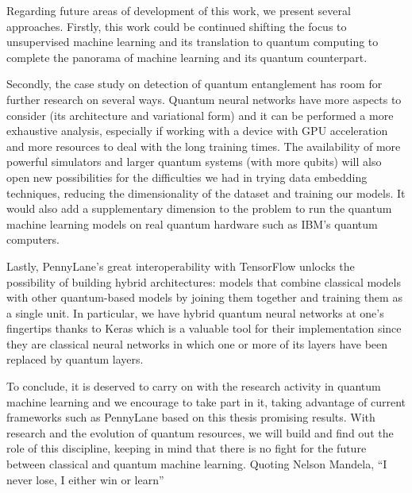 Regarding future areas of development of this work, we present several approaches. Firstly, this work could be continued shifting the focus to unsupervised machine learning and its translation to quantum computing to complete the panorama of machine learning and its quantum counterpart. 

Secondly, the case study on detection of quantum entanglement has room for further research on several ways. Quantum neural networks have more aspects to consider (its architecture and variational form) and it can be performed a more exhaustive analysis, especially if working with a device with GPU acceleration and more resources to deal with the long training times. The availability of more powerful simulators and larger quantum systems (with more qubits) will also open new possibilities for the difficulties we had in trying data embedding techniques, reducing the dimensionality of the dataset and training our models. It would also add a supplementary dimension to the problem to run the quantum machine learning models on real quantum hardware such as IBM's quantum computers.

Lastly, PennyLane's great interoperability with TensorFlow unlocks the possibility of building hybrid architectures: models that combine classical models with other quantum-based models by joining them together and training them as a single unit. In particular, we have hybrid quantum neural networks at one's fingertips thanks to Keras which is a valuable tool for their implementation since they are classical neural networks in which one or more of its layers have been replaced by quantum layers. 

To conclude, it is deserved to carry on with the research activity in quantum machine learning and we encourage to take part in it, taking advantage of current frameworks such as PennyLane based on this thesis promising results. With research and the evolution of quantum resources, we will build and find out the role of this discipline, keeping in mind that there is no fight for the future between classical and quantum machine learning. Quoting Nelson Mandela, ``I never lose, I either win or learn''


\endinput
